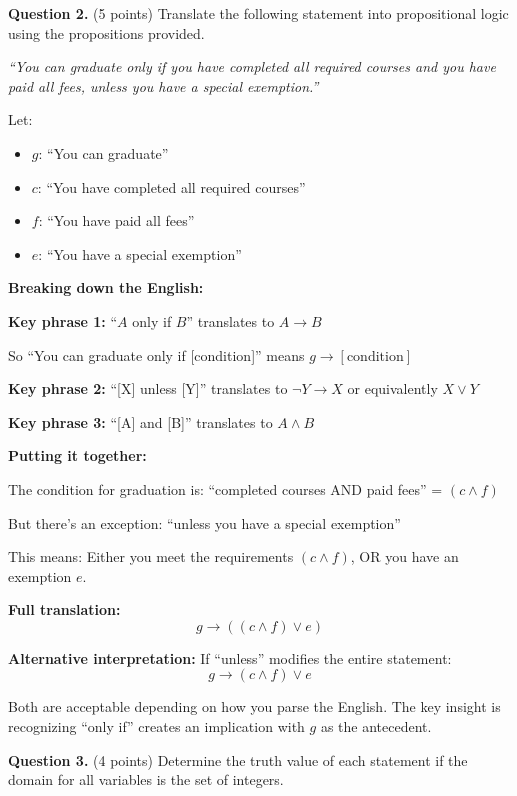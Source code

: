 \documentclass[11pt,a4paper]{article}
\begin{document}
\vspace{15pt}

\textbf{Question 2.} (5 points) Translate the following statement into propositional logic using the propositions provided.

\textit{``You can graduate only if you have completed all required courses and you have paid all fees, unless you have a special exemption.''}

Let:
\begin{itemize}[noitemsep]
    \item $g$: ``You can graduate''
    \item $c$: ``You have completed all required courses''
    \item $f$: ``You have paid all fees''
    \item $e$: ``You have a special exemption''
\end{itemize}

\begin{solnbox}
\textbf{Breaking down the English:}

\textbf{Key phrase 1:} ``$A$ only if $B$'' translates to $A \to B$

So ``You can graduate only if [condition]'' means $g \to [\text{condition}]$

\textbf{Key phrase 2:} ``[X] unless [Y]'' translates to $\neg Y \to X$ or equivalently $X \lor Y$

\textbf{Key phrase 3:} ``[A] and [B]'' translates to $A \land B$

\textbf{Putting it together:}

The condition for graduation is: ``completed courses AND paid fees'' = $(c \land f)$

But there's an exception: ``unless you have a special exemption''

This means: Either you meet the requirements $(c \land f)$, OR you have an exemption $e$.

\textbf{Full translation:}
$$\boxed{g \to ((c \land f) \lor e)}$$

\textbf{Alternative interpretation:} If ``unless'' modifies the entire statement:
$$g \to (c \land f) \lor e$$

Both are acceptable depending on how you parse the English. The key insight is recognizing ``only if'' creates an implication with $g$ as the antecedent.
\end{solnbox}

\vspace{15pt}

\textbf{Question 3.} (4 points) Determine the truth value of each statement if the domain for all variables is the set of integers.
\end{document}

